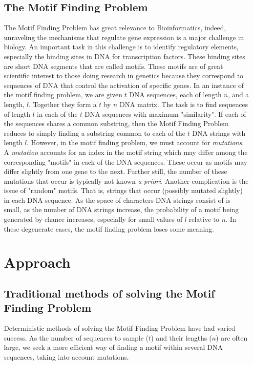 \documentclass{bioinfo}
\begin{document}
\subsection{The Motif Finding Problem}
The Motif Finding Problem has great relevance to Bioinformatics, indeed, unraveling the mechanisms that regulate gene expression is a major challenge in biology. An important task in this challenge is to identify regulatory elements, especially the binding sites in DNA for transcription factors. These binding sites are short DNA segments that are called motifs. These motifs are of great scientific interest to those doing research in genetics because they correspond to sequences of DNA that control the activation of specific genes. \linebreak \linebreak
In an instance of the motif finding problem, we are given $t$ DNA sequences, each of length $n$, and a length, $l$. Together they form a $t$ by $n$ DNA matrix.
The task is to find sequences of length $l$ in each of the $t$ DNA sequences with maximum "similarity". If each of the sequences shares a common substring, then the Motif Finding Problem reduces to simply finding a substring common to each of the $t$ DNA strings with length $l$. However, in the motif finding problem, we must account for \textit{mutations}. A \textit{mutation} accounts for an index in the motif string which may differ among the corresponding "motifs" in each of the DNA sequences. These occur as motifs may differ slightly from one gene to the next. Further still, the number of these mutations that occur is typically not known \textit{a priori}. 
\linebreak \linebreak
Another complication is the issue of "random" motifs. That is, strings that occur (possibly mutated slightly) in each DNA sequence. As the space of characters DNA strings consist of is small, as the number of DNA strings increase, the probability of a motif being generated by chance increases, especially for small values of $l$ relative to $n$. In these degenerate cases, the motif finding problem loses some meaning.

\section{Approach}
\subsection{Traditional methods of solving the Motif Finding Problem}
Deterministic methods of solving the Motif Finding Problem have had varied success.\citep{Das} As the number of sequences to sample ($t$) and their lengths ($n$) are often large, we seek a more efficient way of finding a motif within several DNA sequences, taking into account mutations. 
\end{document}
